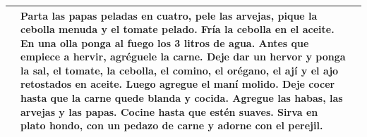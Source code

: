 \documentclass[menu.tex]{subfiles}
\begin{document}
\begin{tabular} {p{3.5cm} p{4cm} p{9cm}}
\begin{compactitem}
\begin{footnotesize}
            \end{footnotesize}
        \end{compactitem}&
        \vspace{-1.6cm}
        Parta las papas peladas en cuatro, pele las arvejas, pique la cebolla menuda y el tomate pelado. Fría la cebolla en el aceite. En una olla ponga al fuego los 3 litros de agua. Antes que empiece a hervir, agréguele la carne. Deje dar un hervor y ponga la sal, el tomate, la cebolla, el comino, el orégano, el ají y el ajo retostados en aceite. Luego agregue el maní molido. Deje cocer hasta que la carne quede blanda y cocida. Agregue las habas, las arvejas y las papas. Cocine hasta que estén suaves. Sirva en plato hondo, con un pedazo de carne y adorne con el perejil.\\
        \hline
        

\end{tabular}
\end{document}
